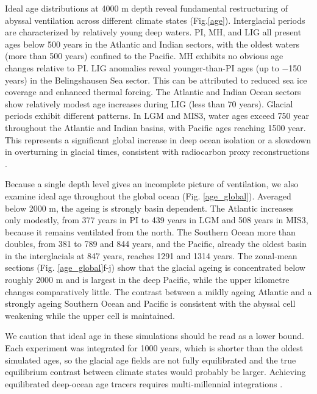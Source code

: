 \documentclass[pdflatex,sn-nature]{sn-jnl}
\begin{document}
Ideal age distributions at 4000 m depth reveal fundamental restructuring of abyssal ventilation across different climate states (Fig.\ref{age}). Interglacial periods are characterized by relatively young deep waters. PI, MH, and LIG all present ages below 500 years in the Atlantic and Indian sectors, with the oldest waters (more than 500 years) confined to the Pacific.  MH exhibits no obvious age changes relative to PI. LIG anomalies reveal younger-than-PI ages (up to $-$150 years) in the Belingshausen Sea sector. This can be attributed to reduced sea ice coverage and enhanced thermal forcing. The Atlantic and Indian Ocean sectors show relatively modest age increases during LIG (less than 70 years). Glacial periods exhibit different patterns. In LGM and MIS3, water ages exceed 750 year throughout the Atlantic and Indian basins, with Pacific ages reaching 1500 year. This represents a significant global increase in deep ocean isolation or a slowdown in overturning in glacial times, consistent with radiocarbon proxy reconstructions \cite{Skinner2017}.

Because a single depth level gives an incomplete picture of ventilation, we also examine ideal age throughout the global ocean (Fig. \ref{age_global}). Averaged below 2000 m, the ageing is strongly basin dependent. The Atlantic increases only modestly, from 377 years in PI to 439 years in LGM and 508 years in MIS3, because it remains ventilated from the north. The Southern Ocean more than doubles, from 381 to 789 and 844 years, and the Pacific, already the oldest basin in the interglacials at 847 years, reaches 1291 and 1314 years. The zonal-mean sections (Fig. \ref{age_global}f-j) show that the glacial ageing is concentrated below roughly 2000 m and is largest in the deep Pacific, while the upper kilometre changes comparatively little. The contrast between a mildly ageing Atlantic and a strongly ageing Southern Ocean and Pacific is consistent with the abyssal cell weakening while the upper cell is maintained.

We caution that ideal age in these simulations should be read as a lower bound. Each experiment was integrated for 1000 years, which is shorter than the oldest simulated ages, so the glacial age fields are not fully equilibrated and the true equilibrium contrast between climate states would probably be larger. Achieving equilibrated deep-ocean age tracers requires multi-millennial integrations \cite{Millet2025}.


\end{document}
